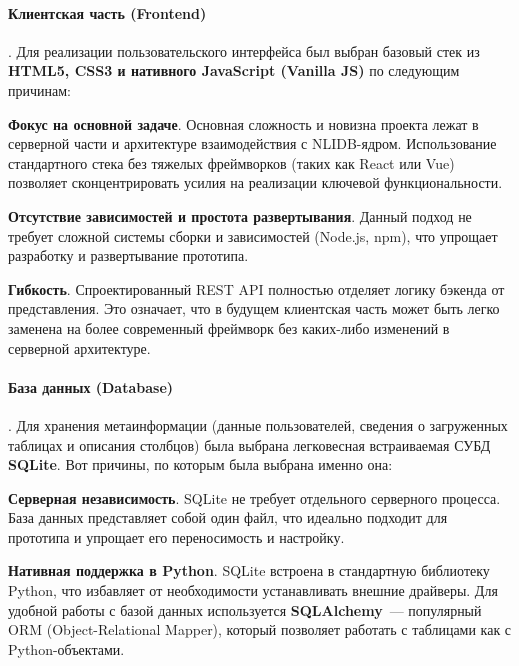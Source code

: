\paragraph{Клиентская часть (Frontend)}.
Для реализации пользовательского интерфейса был выбран базовый стек из
\textbf{HTML5, CSS3 и нативного JavaScript (Vanilla JS)} по следующим причинам:
\begin{compactitem}
      \item \textbf{Фокус на основной задаче}. Основная сложность и новизна проекта лежат в
      серверной части и архитектуре взаимодействия с NLIDB-ядром. Использование стандартного
      стека без тяжелых фреймворков (таких как React или Vue) позволяет сконцентрировать усилия
      на реализации ключевой функциональности.
      \item \textbf{Отсутствие зависимостей и простота развертывания}. Данный подход не требует
      сложной системы сборки и зависимостей (Node.js, npm), что упрощает разработку и
      развертывание прототипа.
      \item \textbf{Гибкость}. Спроектированный REST API полностью отделяет логику бэкенда от
      представления. Это означает, что в будущем клиентская часть может быть легко заменена на
      более современный фреймворк без каких-либо изменений в серверной архитектуре.
\end{compactitem}

\paragraph{База данных (Database)}.
Для хранения метаинформации (данные пользователей, сведения о загруженных таблицах и
описания столбцов) была выбрана легковесная встраиваемая СУБД \textbf{SQLite}. Вот причины, по
которым была выбрана именно она:
\begin{compactitem}
      \item \textbf{Серверная независимость}. SQLite не требует отдельного серверного процесса.
      База данных представляет собой один файл, что идеально подходит для прототипа и упрощает
      его переносимость и настройку.
      \item \textbf{Нативная поддержка в Python}. SQLite встроена в стандартную библиотеку Python,
      что избавляет от необходимости устанавливать внешние драйверы. Для удобной работы с базой
      данных используется \textbf{SQLAlchemy}~--- популярный ORM (Object-Relational Mapper),
      который позволяет работать с таблицами как с Python-объектами.
\end{compactitem}

